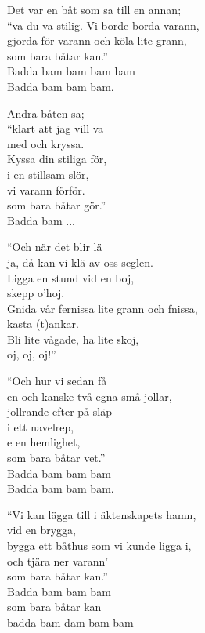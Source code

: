 \vspace{10pt}
Det var en båt som sa till en annan;\\
``va du va stilig. Vi borde borda varann,\\
gjorda för varann och köla lite grann,\\
som bara båtar kan.''\\
Badda bam bam bam bam\\
Badda bam bam bam.\par
\vspace{10pt}
Andra båten sa;\\
``klart att jag vill va\\
med och kryssa.\\
Kyssa din stiliga för,\\
i en stillsam slör,\\
vi varann förför.\\
som bara båtar gör.''\\
Badda bam ...\par
\vspace{10pt}
``Och när det blir lä\\
ja, då kan vi klä av oss seglen.\\
Ligga en stund vid en boj,\\
skepp o'hoj.\\
Gnida vår fernissa lite grann och fnissa,\\
kasta (t)ankar.\\
Bli lite vågade, ha lite skoj,\\
oj, oj, oj!''\par
\vspace{10pt}
``Och hur vi sedan få\\
en och kanske två egna små jollar,\\
jollrande efter på släp\\
i ett navelrep,\\
e en hemlighet,\\
som bara båtar vet.''\\
Badda bam bam bam\\
Badda bam bam bam.\par
\vspace{10pt}
``Vi kan lägga till i äktenskapets hamn,\\
vid en brygga,\\
bygga ett båthus som vi kunde ligga i,\\
och tjära ner varann'\\
som bara båtar kan.''\\
Badda bam bam bam\\
som bara båtar kan\\
badda bam dam bam bam
